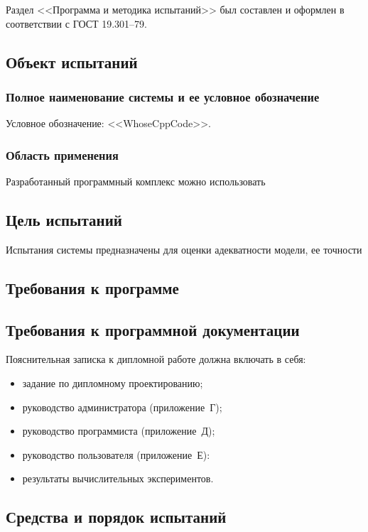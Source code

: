 Раздел <<Программа и методика испытаний>> был составлен и оформлен в соответствии с ГОСТ 19.301--79.~\cite{gost_19301} 

\subsection{Объект испытаний}
\subsubsection{Полное наименование системы и ее условное обозначение}

Условное обозначение: <<WhoseCppCode>>.

\subsubsection{Область применения}

Разработанный программный комплекс можно использовать


\subsection{Цель испытаний}

Испытания системы предназначены для оценки адекватности модели, ее точности

\subsection{Требования к программе}

\subsection{Требования к программной документации}

Пояснительная записка к дипломной работе должна включать в себя:

\begin{itemize}
 \item задание по дипломному проектированию;
 \item руководство администратора (приложение~Г);
 \item руководство программиста (приложение~Д);
 \item руководство пользователя (приложение~Е):
 \item результаты вычислительных экспериментов.
\end{itemize}


\subsection{Средства и порядок испытаний}
